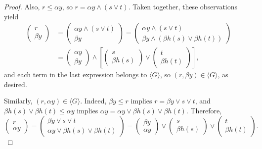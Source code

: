 \begin{proof}
Also, $r \leqslant \alpha y$, so $r = \alpha y \wedge (s\vee t)$.  Taken together, these observations yield
\begin{align}
\left(\begin{array}{c} r \\ \beta y\end{array}\right) &= 
\left(\begin{array}{c} \alpha y \wedge (s\vee t) \\ \beta y\end{array}\right) = 
  \left(\begin{array}{c} \alpha y \wedge (s\vee t) \\ \beta y \wedge (\beta {h(s)} \vee \beta {h(t)}) \end{array}\right)\nonumber\\
  &= 
\left(\begin{array}{c} \alpha y\\ \beta y\end{array}\right) \wedge 
  \left[\left(\begin{array}{c}s \\ \beta {h(s)}\end{array}\right) \vee \left(\begin{array}{c}t \\ \beta {h(t)} \end{array}\right)\right], \nonumber
\end{align}
and each term in the last expression belongs to $\langle G \rangle$, so $(r, \beta y) \in \langle G \rangle$, as desired.

Similarly, $(r, \alpha y) \in \langle G \rangle$.  Indeed, $\beta y \leqslant r$ implies $r = \beta y \vee s\vee t$, and $\beta {h(s)} \vee \beta {h(t)} \leqslant \alpha y$ implies $\alpha y = \alpha y \vee \beta {h(s)} \vee \beta {h(t)}$. Therefore,
\[\left(\begin{array}{c} r \\ \alpha y\end{array}\right) = 
\left(\begin{array}{c} \beta y \vee s\vee t \\ \alpha y \vee \beta {h(s)} \vee \beta {h(t)} \end{array}\right) = 
\left(\begin{array}{c} \beta y\\ \alpha y\end{array}\right) \vee 
\left(\begin{array}{c}s \\ \beta {h(s)}\end{array}\right) \vee \left(\begin{array}{c}t \\ \beta {h(t)} \end{array}\right).\]


\end{proof}
